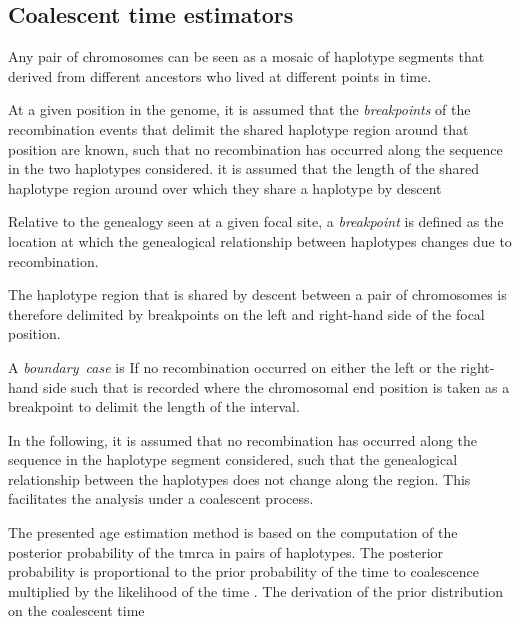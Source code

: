 %
\subsection{Coalescent time estimators}\label{sec:tmrca_clocks}
%


Any pair of chromosomes can be seen as a mosaic of haplotype segments that derived from different ancestors who lived at different points in time.

At a given position in the genome, it is assumed that the \emph{breakpoints} of the recombination events that delimit the shared haplotype region around that position are known, such that no recombination has occurred along the sequence in the two haplotypes considered.
it is assumed that the length of the shared haplotype region around
over which they share a haplotype by descent

Relative to the genealogy seen at a given focal site, a \emph{breakpoint} is defined as the location at which the genealogical relationship between  haplotypes changes due to recombination.

The haplotype region that is shared by descent between a pair of chromosomes is therefore delimited by  breakpoints on the left and right-hand side of the focal position.

A \emph{boundary~case} is
If no recombination occurred on either the left or the right-hand side
such that
is recorded where the chromosomal end position is taken as a breakpoint to delimit the length of the interval.


In the following, it is assumed that no recombination has occurred along the sequence in the haplotype segment considered, such that the genealogical relationship between the  haplotypes does not change along the region.
This facilitates the analysis under a coalescent process.


The presented age estimation method is based on the computation of the posterior probability of the \gls{tmrca} in pairs of haplotypes.
The posterior probability is proportional to the prior probability of the time to coalescence multiplied by the likelihood of the time .
The derivation of the prior distribution on the coalescent time 

